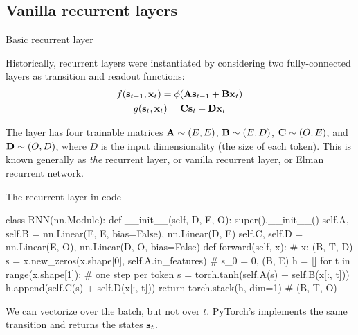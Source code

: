 \documentclass[11pt,aspectratio=169]{beamer}
\begin{document}
\subsection{Vanilla recurrent layers}

\begin{frame}{Basic recurrent layer}
    \setlength{\parskip}{6pt}

    Historically, recurrent layers were instantiated by considering two
    fully-connected layers as transition and readout functions:
    \begin{gather*}
        f(\boldsymbol{\mathbf{s}}_{t-1},\boldsymbol{\mathbf{x}}_t)=\phi(\boldsymbol{\mathbf{A}}\boldsymbol{\mathbf{s}}_{t-1}+\boldsymbol{\mathbf{B}}\boldsymbol{\mathbf{x}}_t) \\
        g(\boldsymbol{\mathbf{s}}_t,\boldsymbol{\mathbf{x}}_t)=\boldsymbol{\mathbf{C}}\boldsymbol{\mathbf{s}}_t+\boldsymbol{\mathbf{D}}\boldsymbol{\mathbf{x}}_t
    \end{gather*}

    The layer has four trainable matrices $\boldsymbol{\mathbf{A}}\sim(E,E)$,
    $\boldsymbol{\mathbf{B}}\sim(E,D)$, $\boldsymbol{\mathbf{C}}\sim(O,E)$, and $\boldsymbol{\mathbf{D}}\sim(O,D)$, where $D$ is
    the input dimensionality (the size of each token). This is known generally
    as \textit{the} recurrent layer, or vanilla recurrent layer, or Elman
    recurrent network.

\end{frame}

\begin{frame}[fragile]{The recurrent layer in code}
    \setlength{\parskip}{5pt}

    \begin{python}[gobble=8,aboveskip=2pt,belowskip=2pt]
        class RNN(nn.Module):
            def __init__(self, D, E, O):
                super().__init__()
                self.A, self.B = nn.Linear(E, E, bias=False), nn.Linear(D, E)
                self.C, self.D = nn.Linear(E, O), nn.Linear(D, O, bias=False)
            def forward(self, x):                          # x: (B, T, D)
                s = x.new_zeros(x.shape[0], self.A.in_features)    # s_0 = 0, (B, E)
                h = []
                for t in range(x.shape[1]):                # one step per token
                    s = torch.tanh(self.A(s) + self.B(x[:, t]))
                    h.append(self.C(s) + self.D(x[:, t]))
                return torch.stack(h, dim=1)               # (B, T, O)
    \end{python}

    We can vectorize over the batch, but not over $t$. PyTorch's
     implements the same transition and returns the
    states $\boldsymbol{\mathbf{s}}_t$.

\end{frame}
\end{document}
